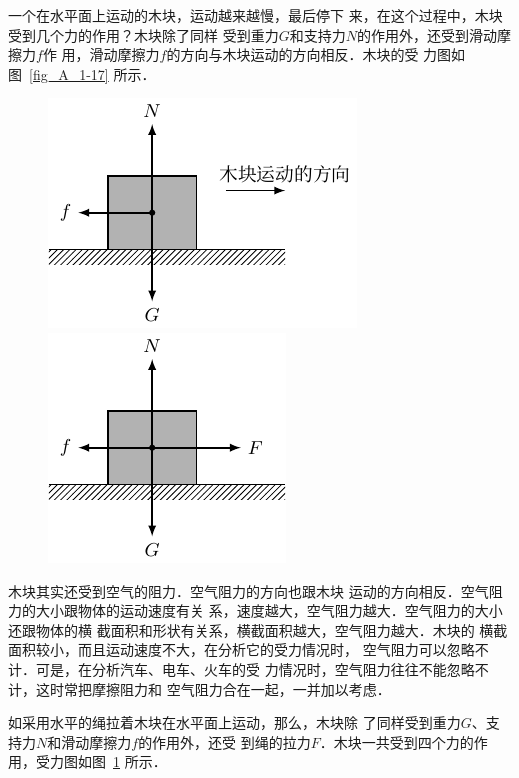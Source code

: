     一个在水平面上运动的木块，运动越来越慢，最后停下
来，在这个过程中，木块受到几个力的作用？木块除了同样
受到重力$G$和支持力$N$的作用外，还受到滑动摩擦力$f$作
用，滑动摩擦力$f$的方向与木块运动的方向相反．木块的受
力图如图~\ref{fig_A_1-17} 所示．

\begin{figure}[htbp]
    \centering
    \begin{minipage}[b]{0.48\textwidth} 
        \centering
        \includegraphics{fig/A/1-17.pdf} 
        \caption{} \label{fig_A_1-17} 
    \end{minipage} 
    \begin{minipage}[b]{0.48\textwidth} 
        \centering
        \includegraphics{fig/A/1-18.pdf} 
        \caption{} \label{fig_A_1-18} 
    \end{minipage} 
\end{figure} 

    木块其实还受到空气的阻力．空气阻力的方向也跟木块
运动的方向相反．空气阻力的大小跟物体的运动速度有关
系，速度越大，空气阻力越大．空气阻力的大小还跟物体的横
截面积和形状有关系，横截面积越大，空气阻力越大．木块的
横截面积较小，而且运动速度不大，在分析它的受力情况时，
空气阻力可以忽略不计．可是，在分析汽车、电车、火车的受
力情况时，空气阻力往往不能忽略不计，这时常把摩擦阻力和
空气阻力合在一起，一并加以考虑．

    如采用水平的绳拉着木块在水平面上运动，那么，木块除
了同样受到重力$G$、支持力$N$和滑动摩擦力$f$的作用外，还受
到绳的拉力$F$．木块一共受到四个力的作用，受力图如图~\ref{fig_A_1-18} 所示．

